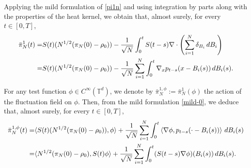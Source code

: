 \documentclass[UTF-8,reqno]{amsart}
\numberwithin{equation}{section}
\begin{document}
Applying the mild formulation of \eqref{pi1n} and using integration by parts along with the properties of the heat kernel, we obtain that, almost surely, for every $t \in [0,T]$,
\begin{align}\label{mild-0}
\bar{\pi}^1_N(t) =&S(t)(N^{1/2}(\pi_N(0)-\rho_0)) -\frac{1}{\sqrt{N}} \int_0^t S(t-s) \nabla \cdot \left( \sum_{i=1}^N \delta_{B_i} \, dB_i \right)\notag\\ 
=&S(t)(N^{1/2}(\pi_N(0)-\rho_0)) -\frac{1}{\sqrt{N}} \sum_{i=1}^N \int_0^t \nabla_x p_{t-s}(x - B_i(s)) \, dB_i(s).
\end{align}

For any test function $\phi \in C^\infty(\mathbb{T}^d)$, we denote by $\bar{\pi}^{1,\phi}_N := \bar{\pi}^1_N(\phi)$ the action of the fluctuation field on $\phi$. Then, from the mild formulation \eqref{mild-0}, we deduce that, almost surely, for every $t \in [0,T]$,
\begin{align*}
\bar{\pi}^{1,\phi}_N(t) 
=&\langle S(t)(N^{1/2}(\pi_N(0)-\rho_0)),\phi\rangle+ \frac{1}{\sqrt{N}} \sum_{i=1}^N \int_0^t \left\langle \nabla \phi, p_{t-s}(\cdot - B_i(s)) \right\rangle \, dB_i(s)\notag\\
=&\langle N^{1/2}(\pi_N(0)-\rho_0),S(t)\phi\rangle+ \frac{1}{\sqrt{N}} \sum_{i=1}^N \int_0^t (S(t-s)\nabla \phi)(B_i(s)) \, dB_i(s).
\end{align*}
\end{document}
